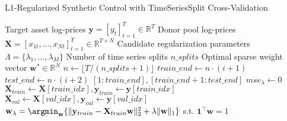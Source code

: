 \begin{algorithm}[H]
\caption{L1-Regularized Synthetic Control with TimeSeriesSplit Cross-Validation}
\label{alg:synthetic_control}
\begin{algorithmic}[1]
\Require 
    \State Target asset log-prices $\mathbf{y} = [y_t]_{t=1}^T \in \mathbb{R}^T$
    \State Donor pool log-prices $\mathbf{X} = [x_{1t}, ..., x_{Nt}]_{t=1}^T \in \mathbb{R}^{T \times N}$
    \State Candidate regularization parameters $\Lambda = \{\lambda_1, ..., \lambda_M\}$
    \State Number of time series splits $n\_splits$
\mx 
\Ensure 
    \State Optimal sparse weight vector $\mathbf{w}^* \in \mathbb{R}^N$
\mx
{}
\Comment{\scalebox{0.9}{\textcolor{Grey_color}{Extract expanding-window train/validation sets}}}
    \State $n \gets \lfloor T/(n\_splits + 1) \rfloor$ \Comment{\scalebox{0.9}{\textcolor{Grey_color}{Length of test fold}}}
        \State $train\_end \gets n \cdot (i + 1)$
        \Comment{\scalebox{0.9}{\textcolor{Grey_color}{End index of training set}}}
        \State $test\_end \gets n \cdot (i + 2)$
        \Comment{\scalebox{0.9}{\textcolor{Grey_color}{End index of validation set}}}
        \State \Return $[1:train\_end], [train\_end+1:test\_end]$ \Comment{\scalebox{0.9}{\textcolor{Grey_color}{Train/test indices}}}
    \EndFor
\EndFunction
\mx
{}
    \Comment{\scalebox{0.9}{\textcolor{Grey_color}{for each $\lambda$, perform time series cross-validation}}}
        \State $mse_{\lambda} \gets 0$
            \State $\mathbf{X}_{train} \gets \mathbf{X}[train\_idx], \mathbf{y}_{train} \gets \mathbf{y}[train\_idx]$
            \Comment{\scalebox{0.9}{\textcolor{Grey_color}{Extract training data}}}
            \State $\mathbf{X}_{val} \gets \mathbf{X}[val\_idx], \mathbf{y}_{val} \gets \mathbf{y}[val\_idx]$
            \Comment{\scalebox{0.9}{\textcolor{Grey_color}{Extract validation data}}}
            \State $\mathbf{w}_{\lambda} = \argmin_{\mathbf{w}} \{\|\mathbf{y}_{train} - \mathbf{X}_{train}\mathbf{w}\|_2^2 + \lambda\|\mathbf{w}\|_1\}$ s.t. $\mathbf{1}^\top \mathbf{w} = 1$

\end{algorithmic}
\end{algorithm}
